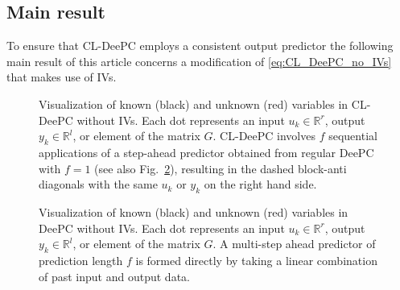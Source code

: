 \subsection{Main result}
To ensure that \ac{CL-DeePC} employs a consistent output predictor the following main result of this article concerns a modification of \eqref{eq:CL_DeePC_no_IVs} that makes use of \ac{IVs}.
\begin{figure}[b!]
\centering

\caption{Visualization of known (black) and unknown (red) variables in \ac{CL-DeePC} without \ac{IVs}. Each dot represents an input $u_k\in\mathbb{R}^r$, output $y_k\in\mathbb{R}^l$, or element of the matrix $G$. \ac{CL-DeePC} involves $f$ sequential applications of a step-ahead predictor obtained from regular \ac{DeePC} with $f=1$ (see also Fig.~\ref{fig:regular-DeePC}), resulting in the dashed block-anti diagonals with the same $u_k$ or $y_k$ on the right hand side.}
\label{fig:CL-DeePC}
\end{figure}
\begin{figure}[b!]
\centering

\caption{Visualization of known (black) and unknown (red) variables in \ac{DeePC} without \ac{IVs}. Each dot represents an input $u_k\in\mathbb{R}^r$, output $y_k\in\mathbb{R}^l$, or element of the matrix $G$. A multi-step ahead predictor of prediction length $f$ is formed directly by taking a linear combination of past input and output data.\\\vspace{0.75mm}}
\label{fig:regular-DeePC}
\end{figure}
%
\setcounter{thm}{0}
